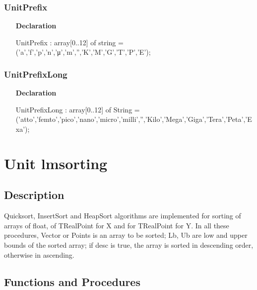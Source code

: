 \documentclass[12pt,a4paper,oneside]{report}
\newcommand{\lmath}[1]{   %
	\marginpar{\vspace{#1} 
		\begin{flushright}
			LMath
	\end{flushright} }
}
\newcommand{\declarationitem}[1]{\textbf{#1}}
\begin{document}
\subsubsection{UnitPrefix}
\label{lmunitsformat-UnitPrefix}
\begin{itemize}\item[\declarationitem{Declaration}\hfill]
	\begin{flushleft}
		\begin{ttfamily}
			UnitPrefix  : array[0..12] of string = ('a','f','p','n','μ','m','','K','M','G','T','P','E');\end{ttfamily}
		
	\end{flushleft}
	
\end{itemize}
\subsubsection{UnitPrefixLong}
\label{lmunitsformat-UnitPrefixLong}
\begin{itemize}\item[\declarationitem{Declaration}\hfill]
	\begin{flushleft}
		\begin{ttfamily}
			UnitPrefixLong : array[0..12] of String =
			('atto','femto','pico','nano','micro','milli','','Kilo','Mega','Giga','Tera','Peta','Exa');\end{ttfamily}
		
	\end{flushleft}
	
\end{itemize}
\section{Unit lmsorting}\lmath{-24pt}
\label{lmsorting}
\subsection{Description}
Quicksort, InsertSort and HeapSort algorithms are implemented for sorting of arrays of float, of TRealPoint for X and for TRealPoint for Y. In all these procedures, Vector or Points is an array to be sorted; Lb, Ub are low and upper bounds of the sorted array; if desc is true, the array is sorted in descending order, otherwise in ascending.
\subsection{Functions and Procedures}
\end{document}
